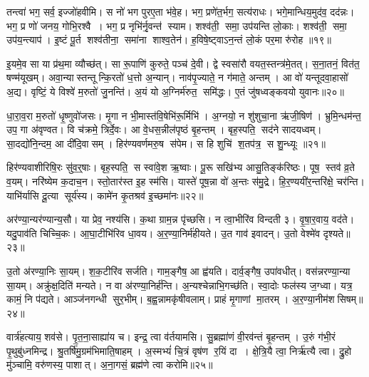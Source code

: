 तन्त्वा॑ भग॒ सर्व॒ इज्जो॑हवीमि।
स नो॑ भग पुरए॒ता भ॑वे॒ह।
भग॒ प्रणे॑त॒र्भग॒ सत्य॑राधः।
भगे॒मान्धिय॒मुद॑व॒ दद॑न्नः।
भग॒ प्र णो॑ जनय॒ गोभि॒रश्वै।
भग॒ प्र नृभि॑र्नृ॒वन्त॑ स्याम।
शश्व॑ती॒ समा॒ उप॑यन्ति लो॒काः।
शश्व॑ती॒ समा॒ उप॑य॒न्त्याप॑।
इ॒ष्टं पू॒र्त शश्व॑तीना॒ समा॑ना शाश्व॒तेन॑।
ह॒विषे॒ष्ट्वाऽन॒न्तं लो॒कं पर॒मा रु॑रोह ॥१९॥

इ॒यमे॒व सा या प्र॑थ॒मा व्यौच्छ॑त्।
सा रू॒पाणि॑ कुरुते॒ पञ्च॑ दे॒वी।
द्वे स्वसा॑रौ वयत॒स्तन्त्र॑मे॒तत्।
स॒ना॒तनं॒ वित॑त॒ षण्म॑यूखम्।
अवा॒न्यास्तन्तून्कि॒रतो॑ ध॒त्तो अ॒न्यान्।
नाव॑पृ॒ज्याते॒ न ग॑माते॒ अन्तम्।
आ वो॑ यन्तूदवा॒हासो॑ अ॒द्य।
वृष्टिं॒ ये विश्वे॑ म॒रुतो॑ जु॒नन्ति॑।
अ॒यं यो अ॒ग्निर्म॑रुत॒ समि॑द्धः।
ए॒तं जु॑षध्वङ्कवयो युवानः॥२०॥

धा॒रा॒व॒रा म॒रुतो॑ धृ॒ष्णुवो॑जसः।
मृ॒गा न भी॒मास्त॑वि॒षेभि॑रू॒र्मिभि॑।
अ॒ग्नयो॒ न शु॑शुचा॒ना ऋ॑जी॒षिण॑।
भ्रुमि॒न्धम॑न्त॒ उप॒ गा अ॑वृण्वत।
वि च॑क्रमे॒ त्रिर्दे॒वः।
आ वे॒धस॒न्नील॑पृष्ठं बृ॒हन्तम्।
बृह॒स्पति॒ सद॑ने सादयध्वम्।
सा॒दद्यो॑नि॒न्दम॒ आ दी॑दि॒वासम्।
हिर॑ण्यवर्णमरु॒ष स॑पेम।
स हि शुचि॑ श॒तप॑त्र॒ स शु॒न्ध्यूः ॥२१॥

हिर॑ण्यवाशीरिषि॒रः सु॑व॒र्॒षाः।
बृह॒स्पति॒ स स्वा॑वे॒श ऋ॒ष्वाः।
पू॒रू सखि॑भ्य आसु॒तिङ्क॑रिष्ठः।
पूष॒ स्तव॑ व्र॒ते व॒यम्।
नरि॑ष्येम क॒दाच॒न।
स्तो॒तार॑स्त इ॒ह स्म॑सि।
यास्ते॑ पूष॒न्ना वो॑ अ॒न्तः स॑मु॒द्रे।
हि॒र॒ण्ययी॑र॒न्तरि॑क्षे॒ चर॑न्ति।
याभि॑र्यासि दू॒त्या सूर्य॑स्य।
कामे॑न कृ॒तश्रव॑ इ॒च्छमा॑नः॥२२॥

अर॑ण्या॒न्यर॑ण्यान्य॒सौ।
या प्रेव॒ नश्य॑सि।
क॒था ग्राम॒न्न पृ॑च्छसि।
न त्वा॒भीरि॑व विन्दती ३।
वृ॒षा॒र॒वाय॒ वद॑ते।
यदु॒पाव॑ति चिच्चि॒कः।
आ॒घा॒टीभि॑रिव धा॒वय\sn{}।
अ॒र॒ण्या॒निर्म॑हीयते।
उ॒त गाव॑ इवादन्।
उ॒तो वेश्मे॑व दृश्यते॥२३॥

उ॒तो अ॑रण्या॒निः सा॒यम्।
श॒क॒टीरि॑व सर्जति।
गाम॒ङ्गैष॒ आ ह्व॑यति।
दार्व॒ङ्गैष॒ उपा॑वधीत्।
वस॑न्नरण्या॒न्या सा॒यम्।
अक्रु॑क्ष॒दिति॑ मन्यते।
न वा अ॑रण्या॒निर्\mbox{}ह॑न्ति।
अ॒न्यश्चेन्नाभि॒गच्छ॑ति।
स्वा॒दोः फल॑स्य ज॒ग्ध्वा।
यत्र॒ कामं॒ नि प॑द्यते।
आञ्ज॑नगन्धी सुर॒भीम्।
ब॒ह्व॒न्नामकृ॑षीवलाम्।
प्राहं मृ॒गाणां मा॒तरम्।
अ॒र॒ण्या॒नीम॑शसिषम्॥२४॥\anuvakamend[स्या॒म॒ रु॒रो॒ह॒ यु॒वा॒न॒ शु॒न्ध्यूरि॒च्छमा॑नो दृश्यते॒ निप॑द्यते च॒त्वारि॑ च]

वार्त्र॑हत्याय॒ शव॑से।
पृ॒त॒ना॒साह्या॑य च।
इन्द्र॒ त्वा व॑र्तयामसि।
सु॒ब्रह्मा॑णं वी॒रव॑न्तं बृ॒हन्तम्।
उ॒रुं ग॑भी॒रं पृ॒थुबु॑ध्नमिन्द्र।
श्रु॒तर्\mbox{}षि॑मु॒ग्रम॑भिमाति॒षाहम्।
अ॒स्मभ्यं॑ चि॒त्रं वृष॑ण र॒यिं दा।
क्षे॒त्रि॒यै त्वा॒ निर्\mbox{}ऋ॑त्यै त्वा।
द्रु॒हो मु॑ञ्चामि॒ वरु॑णस्य॒ पाशात्।
अ॒ना॒गसं॒ ब्रह्म॑णे त्वा करोमि॥२५॥

